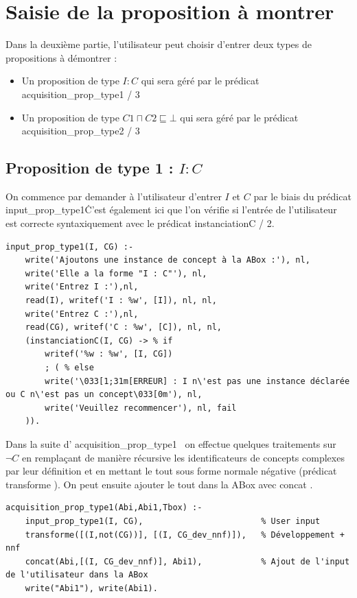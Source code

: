 \documentclass{article}
\begin{document}
\section{Saisie de la proposition à montrer}
Dans la deuxième partie, l'utilisateur peut choisir d'entrer deux types de propositions à démontrer : 
\begin{itemize}
    \item Un proposition de type $ I : C $ qui sera géré par le prédicat \color{blue}acquisition\_prop\_type1 / 3 \color{black}
    \item Un proposition de type $ C1 \sqcap C2 \sqsubseteq \bot  $ qui sera géré par le prédicat \color{blue}acquisition\_prop\_type2 / 3 \color{black}
\end{itemize}

\subsection{Proposition de type 1 : $ I : C $ }
On commence par demander à l'utilisateur d'entrer $ I $ et $ C $ par le biais du prédicat \color{blue}input\_prop\_type1\color{black}\. C'est également ici que l'on vérifie si l'entrée de l'utilisateur est correcte syntaxiquement avec le prédicat \color{blue}instanciationC / 2\color{black}.
\begin{verbatim}
input_prop_type1(I, CG) :-
    write('Ajoutons une instance de concept à la ABox :'), nl,
    write('Elle a la forme "I : C"'), nl,
    write('Entrez I :'),nl, 
    read(I), writef('I : %w', [I]), nl, nl,
    write('Entrez C :'),nl, 
    read(CG), writef('C : %w', [C]), nl, nl,
    (instanciationC(I, CG) -> % if 
        writef('%w : %w', [I, CG])
        ; ( % else
        write('\033[1;31m[ERREUR] : I n\'est pas une instance déclarée ou C n\'est pas un concept\033[0m'), nl,
        write('Veuillez recommencer'), nl, fail
    )).
\end{verbatim}
Dans la suite d'\color{blue} acquisition\_prop\_type1 \color{black}\ on effectue quelques traitements sur $ \neg C $ en remplaçant de manière récursive les identificateurs de concepts complexes par leur définition et en mettant le tout sous forme normale négative (prédicat \color{blue} transforme \color{black}). On peut ensuite ajouter le tout dans la ABox avec \color{blue} concat \color{black}.
\begin{verbatim}
acquisition_prop_type1(Abi,Abi1,Tbox) :- 
    input_prop_type1(I, CG),                        % User input
    transforme([(I,not(CG))], [(I, CG_dev_nnf)]),   % Développement + nnf
    concat(Abi,[(I, CG_dev_nnf)], Abi1),            % Ajout de l'input de l'utilisateur dans la ABox
    write("Abi1"), write(Abi1). 
\end{verbatim}
\end{document}
